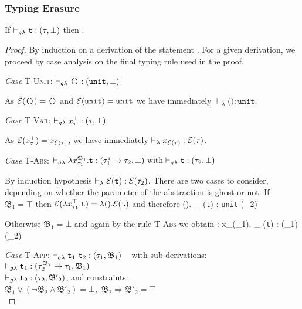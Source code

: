 \subsubsection{Typing Erasure}
\begin{lemma}
	If  $\vdash_{g\lambda} \texttt{t} : (\tau, \bot)$  
	then .
\end{lemma}
\begin{proof}
By induction on a derivation of the statement 
. 
For a given derivation, we proceed by case analysis on the final typing rule
 used in the proof. 
 
 	\noindent\textit{Case} \textsc{T-Unit}:\quad 
 	$\vdash_{g\lambda} \texttt{()} : (\texttt{unit}, \bot)$ 
 	
 		As  $\mathcal{E}(\texttt{()}) = \texttt{()}$ and $ \mathcal{E}(\texttt{unit}) = \texttt{unit}$
 		 we have immediately $\vdash_{\lambda} \texttt{()} : \texttt{unit}$.
 	
 	\noindent\textit{Case} \textsc{T-Var}:\quad 
 	$\vdash_{g\lambda} x_{\tau}^{\bot} : (\tau, \bot)$
 	 
 	 As  $\mathcal{E}(x_{\tau}^{\bot}) = x_{\mathcal{E}(\tau)}$, we have immediately 
 	 $\vdash_{\lambda} x_{\mathcal{E}(\tau)} : \mathcal{E}(\tau)$.
 	 

 	\noindent\textit{Case} \textsc{T-Abs}:\quad
 		$\vdash_{g\lambda} \lambda x_{\tau_{1}}^{\mathfrak{B}_{1}}.\texttt{t} : (\tau_{1}^{_{1}} \rightarrow 
 		\tau_{2}, \bot)~ \text{with} \vdash_{g\lambda} \texttt{t} : (\tau_{2}, \bot)	$
 		
 		By induction hypothesis $\vdash_{\lambda} \mathcal{E}(\texttt{t}) : \mathcal{E}(\tau_{2}) $.
 		There are two cases to consider, depending on whether the parameter 
 		of the abstraction is ghost or not. If $\mathfrak{B_{1} = \top}$ then 
 		$\mathcal{E}(\lambda x_{\tau_{1}}^{\top}. \texttt{t}) = \lambda (). \mathcal{E}(\texttt{t})$
 		and therefore
 		{\lambda (). \vdash_{\lambda} \e(\texttt{t}) : 
 		\texttt{unit} \rightarrow 	\e(\tau_{2})} 
 	
 		Otherwise $\mathfrak{B_{1} = \bot}$ and again by the rule \textsc{T-Abs} 
 		we obtain :
 		{\lambda x_{\e(\tau_{1})}. \vdash_{\lambda} \e(\texttt{t}) : 
 		\e(\tau_{1}) \rightarrow 	\e(\tau_{2})}
 		
 		 	
 	\noindent\textit{Case} \textsc{T-App}:\quad
 	$\vdash_{g\lambda} \texttt{t}_{1}~\texttt{t}_{2} : (\tau_{1}, \mathfrak{B}_{1}) $ ~
 	with sub-derivations: \\
	$\vdash_{g\lambda} \texttt{t}_{1} : (\tau_{2}^{\mathfrak{B}_{2}} \rightarrow \tau_{1}, \mathfrak{B}_{1})$ \\
	$ \vdash_{g\lambda} \texttt{t}_{2} : (\tau_{2}, \mathfrak{B'}_{2}) $, \quad 
	and constraints: \\ 
	$ \mathfrak{B}_{1}\vee (\neg \mathfrak{B}_{2} \wedge \mathfrak{B'}_{2})=\bot,$
	$ \mathfrak{B}_{2} \Rightarrow \mathfrak{B'}_{2} = \top $ \\
	

\end{proof}
